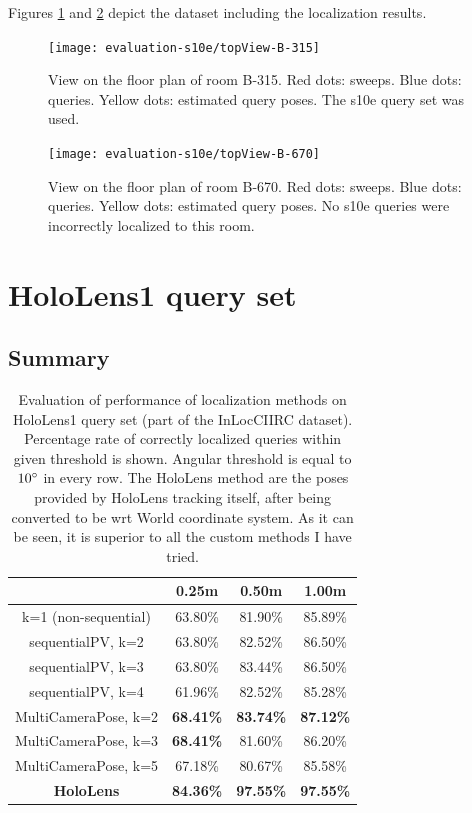 \documentclass[twoside]{ctuthesis}
\theoremstyle{plain}
\theoremstyle{definition}
\theoremstyle{note}
\begin{document}
Figures \ref{fig:topView-B-315} and \ref{fig:topView-B-670} depict the dataset including the localization results.

\begin{figure}[htb!]
	\centering
 	\texttt{[image: evaluation-s10e/topView-B-315]}
 	\caption[s10e B-315 top-view]{View on the floor plan of room B-315. Red dots: sweeps. Blue dots: queries. Yellow dots: estimated query poses. The s10e query set was used.}
 	\label{fig:topView-B-315}
\end{figure} 

\begin{figure}[htb!]
	\centering
 	\texttt{[image: evaluation-s10e/topView-B-670]}
 	\caption[s10e B-670 top-view]{View on the floor plan of room B-670. Red dots: sweeps. Blue dots: queries. Yellow dots: estimated query poses. No s10e queries were incorrectly localized to this room.}
 	\label{fig:topView-B-670}
\end{figure} 

\section{HoloLens1 query set}

\subsection{Summary}

\begin{table}[htb!]
	\centering
	\begin{tabular}{|c|c|c|c|}
		\hline
		\diagbox{\small Method}{\small Threshold} & 0.25m & 0.50m & 1.00m \\
		\hline
		k=1 (non-sequential) & 63.80\% & 81.90\% & 85.89\% \\
		\hline
		sequentialPV, k=2 & 63.80\% & 82.52\% & 86.50\% \\
		\hline
		sequentialPV, k=3 & 63.80\% & 83.44\% & 86.50\% \\
		\hline
		sequentialPV, k=4 & 61.96\% & 82.52\% & 85.28\% \\
		\hline
		MultiCameraPose, k=2 & \bfseries 68.41\% & \bfseries 83.74\% & \bfseries 87.12\% \\
		\hline
		MultiCameraPose, k=3 & \bfseries 68.41\% & 81.60\% & 86.20\% \\
		\hline
		MultiCameraPose, k=5 & 67.18\% & 80.67\% & 85.58\% \\
		\hline
		\bfseries HoloLens & \bfseries 84.36\% & \bfseries 97.55\% & \bfseries 97.55\% \\
		\hline
	\end{tabular}
	\caption[InLocCIIRC performance on HoloLens1 query set]{Evaluation of performance of localization methods on HoloLens1 query set (part of the InLocCIIRC dataset). Percentage rate of correctly localized queries within given threshold is shown. Angular threshold is equal to $10\degree$ in every row. The HoloLens method are the poses provided by HoloLens tracking itself, after being converted to be wrt World coordinate system. As it can be seen, it is superior to all the custom methods I have tried.}
	\label{tab:HL1-InLoc-statistics}
\end{table}
\end{document}
